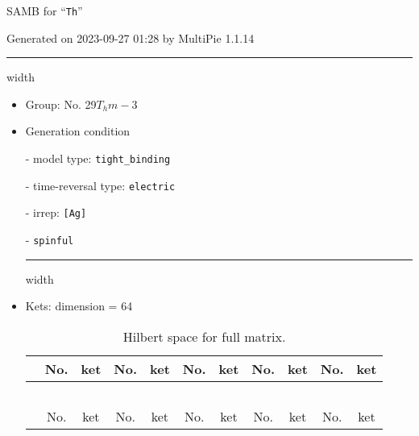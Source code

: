 \documentclass[fleqn,10pt,landscape]{article}
\begin{document}
\setcounter{MaxMatrixCols}{16}

\setlength{\baselineskip}{16pt}
\footnotesize
\begin{center}
\LARGE
SAMB for ``\texttt{Th}''
\end{center}
\begin{flushright}
Generated on 2023-09-27 01:28 by MultiPie 1.1.14
\end{flushright}
\vspace{1cm}


 \hfil \hrule height 1mm width \textwidth \hfil

\begin{itemize}
\item Group: No. 29\quad$T_{h}$\quad$m-3$\quad[ cubic ]

\vspace{5mm}

\item Generation condition

\quad - model type: \texttt{tight_binding}

\quad - time-reversal type: \texttt{electric}

\quad - irrep: \texttt{[Ag]}

\quad - \texttt{spinful}


 \hfil \hrule height 1mm width \textwidth \hfil

\item Kets: dimension = 64
\begin{center}
\renewcommand{\arraystretch}{1.3}
\begin{longtable}{c|cc|cc|cc|cc|cc}
\caption{Hilbert space for full matrix.}
 \\
 \hline \hline
 & No. & ket & No. & ket & No. & ket & No. & ket & No. & ket \\ \hline \endfirsthead

\multicolumn{10}{l}{\tablename\ \thetable{}} \\
 \hline \hline
 & No. & ket & No. & ket & No. & ket & No. & ket & No. & ket \\ \hline \endhead


\end{longtable}
\end{center}
\end{itemize}
\end{document}
